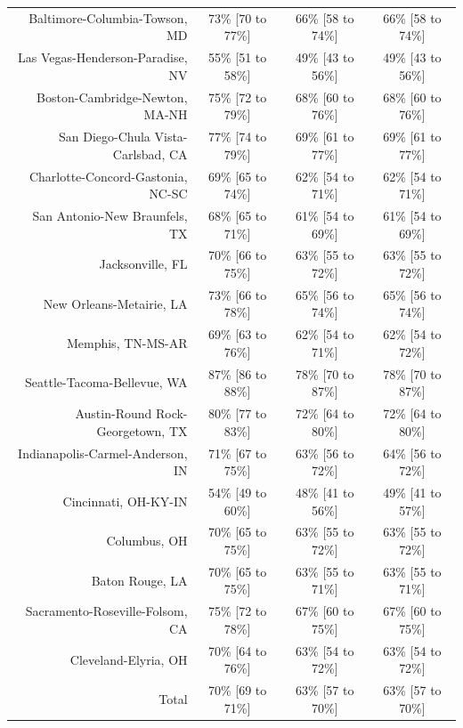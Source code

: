 \documentclass{article}
\begin{document}
\begin{table}[H]
\begin{tabular}{|r|c|c|c|}
		Baltimore-Columbia-Towson, MD & 73\% [70 to 77\%] & 66\% [58 to 74\%] & 66\% [58 to 74\%]\\
		Las Vegas-Henderson-Paradise, NV & 55\% [51 to 58\%] & 49\% [43 to 56\%] & 49\% [43 to 56\%]\\
		Boston-Cambridge-Newton, MA-NH & 75\% [72 to 79\%] & 68\% [60 to 76\%] & 68\% [60 to 76\%]\\
		San Diego-Chula Vista-Carlsbad, CA & 77\% [74 to 79\%] & 69\% [61 to 77\%] & 69\% [61 to 77\%]\\
		Charlotte-Concord-Gastonia, NC-SC & 69\% [65 to 74\%] & 62\% [54 to 71\%] & 62\% [54 to 71\%]\\
		San Antonio-New Braunfels, TX & 68\% [65 to 71\%] & 61\% [54 to 69\%] & 61\% [54 to 69\%]\\
		Jacksonville, FL & 70\% [66 to 75\%] & 63\% [55 to 72\%] & 63\% [55 to 72\%]\\
		New Orleans-Metairie, LA & 73\% [66 to 78\%] & 65\% [56 to 74\%] & 65\% [56 to 74\%]\\
		Memphis, TN-MS-AR & 69\% [63 to 76\%] & 62\% [54 to 71\%] & 62\% [54 to 72\%]\\
		Seattle-Tacoma-Bellevue, WA & 87\% [86 to 88\%] & 78\% [70 to 87\%] & 78\% [70 to 87\%]\\
		Austin-Round Rock-Georgetown, TX & 80\% [77 to 83\%] & 72\% [64 to 80\%] & 72\% [64 to 80\%]\\
		Indianapolis-Carmel-Anderson, IN & 71\% [67 to 75\%] & 63\% [56 to 72\%] & 64\% [56 to 72\%]\\
		Cincinnati, OH-KY-IN & 54\% [49 to 60\%] & 48\% [41 to 56\%] & 49\% [41 to 57\%]\\
		Columbus, OH & 70\% [65 to 75\%] & 63\% [55 to 72\%] & 63\% [55 to 72\%]\\
		Baton Rouge, LA & 70\% [65 to 75\%] & 63\% [55 to 71\%] & 63\% [55 to 71\%]\\
		Sacramento-Roseville-Folsom, CA & 75\% [72 to 78\%] & 67\% [60 to 75\%] & 67\% [60 to 75\%]\\
		Cleveland-Elyria, OH & 70\% [64 to 76\%] & 63\% [54 to 72\%] & 63\% [54 to 72\%]\\
		\hline
		Total & 70\% [69 to 71\%] & 63\% [57 to 70\%] & 63\% [57 to 70\%]\\
		\hline
	\end{tabular}
\end{table}
\end{document}
